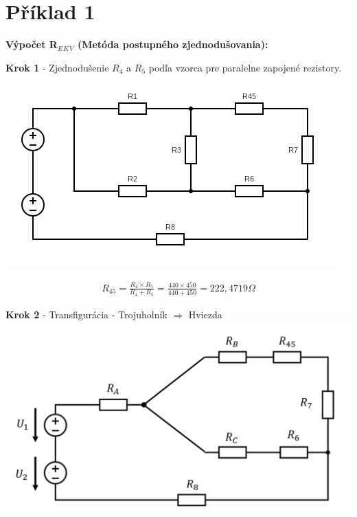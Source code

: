 \section{Příklad 1}

\large{\textbf{Výpočet R$_E$$_K$$_V$ (Metóda postupného zjednodušovania):}}

\begin{center}

\textbf{Krok 1} - Zjednodušenie $R_4$ a $R_5$ podľa vzorca pre paralelne zapojené rezistory.
\includegraphics[scale=0.6,keepaspectratio]{fig/c1.png} \\
\end{center}

\begin{gather*}
R_{45} = \frac{R_4 \times R_5}{R_4 + R_5} = \frac{440 \times 450}{440 + 450} = 222,4719 \Omega
\end{gather*}

\newpage

\begin{center}
\textbf{Krok 2} - Transfigurácia - Trojuholník $\Rightarrow$ Hviezda
\includegraphics[scale=0.6,keepaspectratio]{fig/c2.png} \\
\end{center}

